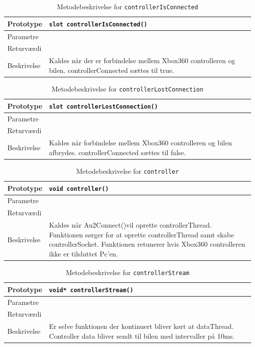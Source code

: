 \begin{table}[H]
\begin{tabularx}{\textwidth}{| L{2.5 cm} | Z |} \hline
Prototype & \texttt{slot controllerIsConnected()} \\\hline
Parametre &   \\\hline
Returværdi &  \\\hline
Beskrivelse & Kaldes når der er forbindelse mellem Xbox360 controlleren og bilen. controllerConnected sættes til true.   \\\hline
\end{tabularx}
\caption{Metodebeskrivelse for \texttt{controllerIsConnected}}
\label{table:met_controllerIsConnected}
\end{table}

\begin{table}[H]
\begin{tabularx}{\textwidth}{| L{2.5 cm} | Z |} \hline
Prototype & \texttt{slot controllerLostConnection()} \\\hline
Parametre &   \\\hline
Returværdi &  \\\hline
Beskrivelse & Kaldes når forbindelse mellem Xbox360 controlleren og bilen afbrydes. controllerConnected sættes til false.   \\\hline
\end{tabularx}
\caption{Metodebeskrivelse for \texttt{controllerLostConnection}}
\label{table:met_ccontrollerLostConnection}
\end{table}

\begin{table}[H]
\begin{tabularx}{\textwidth}{| L{2.5 cm} | Z |} \hline
Prototype & \texttt{void controller()} \\\hline
Parametre &   \\\hline
Returværdi &  \\\hline
Beskrivelse & Kaldes når Au2Connect()vil oprette controllerThread. Funktionen sørger for at oprette controllerThread samt skabe controllerSocket. Funktionen retunerer hvis Xbox360 controlleren ikke er tilsluttet Pc'en.   \\\hline
\end{tabularx}
\caption{Metodebeskrivelse for \texttt{controller}}
\label{table:met_controller}
\end{table}

\begin{table}[H]
\begin{tabularx}{\textwidth}{| L{2.5 cm} | Z |} \hline
Prototype & \texttt{void* controllerStream()} \\\hline
Parametre &   \\\hline
Returværdi &  \\\hline
Beskrivelse & Er selve funktionen der kontinuert bliver kørt at dataThread. Controller data bliver sendt til bilen med intervaller på 10ms.  \\\hline
\end{tabularx}
\caption{Metodebeskrivelse for \texttt{controllerStream}}
\label{table:met_controllerStream}
\end{table}

